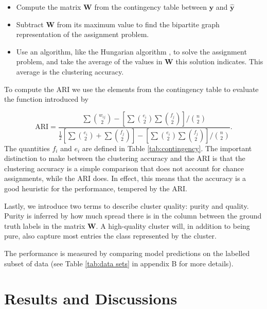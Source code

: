 \documentclass[preprint,12pt]{elsarticle}
\begin{document}
\begin{itemize}
    \item Compute the matrix $\mathbf{W}$ from the contingency table between $\mathbf{y}$ and $\mathbf{\hat{y}}$
    \item Subtract $\mathbf{W}$ from its maximum value to find the bipartite graph representation of the assignment problem.
    \item Use an algorithm, like the Hungarian algorithm \cite{burkard2012}, to solve the assignment problem, and take the average of the values in $\mathbf{W}$ this solution indicates. This average is the clustering accuracy. 
\end{itemize}

To compute the ARI we use the elements from the contingency table to evaluate the function introduced by \citet{Hubert1985}

\begin{equation}\label{eq:ari}
\text{ARI} = \frac{\sum  \binom{w_{ij}}{2} - \left[\sum  \binom{e_{i}}{2} \sum  \binom{f_{j}}{2}  \right]/\binom{n}{2}}{\frac{1}{2}\left[\sum  \binom{e_{i}}{2} + \sum  \binom{f_{j}}{2}  \right]- \left[\sum  \binom{e_{i}}{2} \sum  \binom{f_{j}}{2}  \right]/\binom{n}{2}}.
\end{equation}
The quantities $f_i$ and $e_i$ are defined in Table \ref{tab:contingency}.
The important distinction to make between the clustering accuracy and the ARI is that the clustering accuracy is a simple comparison that does not account for chance assignments, while the ARI does. In effect, this means that the accuracy is a good heuristic for the performance, tempered by the ARI. 

Lastly, we introduce two terms to describe cluster quality: purity and quality. Purity is inferred by how much spread there is in the column between the ground truth labels in the matrix $\mathbf{W}$. A high-quality cluster will, in addition to being pure, also capture most entries the class represented by the cluster.

The performance is measured by comparing model predictions on the labelled subset of data (see Table \ref{tab:data sets} in  appendix B for more details).


\section{Results and Discussions}\label{sec:results}
\end{document}
